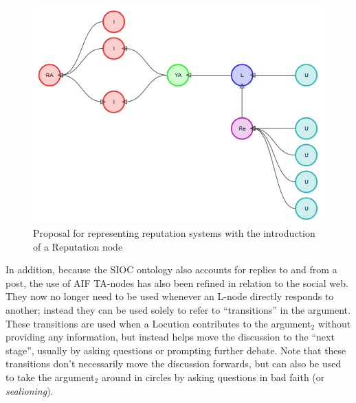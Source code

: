 \begin{figure}
\centering
\includegraphics[scale=\scaleProps]{./figures/cmna_proposals/likes1.png}
\caption{Proposal for representing reputation systems with the introduction of a Reputation node}
\label{figure:cmna:likes2}
\end{figure}

In addition, because the SIOC ontology also accounts for replies to and from a post, the use of AIF TA-nodes has also been refined in relation to the social web. They now no longer need to be used whenever an L-node directly responds to another; instead they can be used solely to refer to ``transitions'' in the argument. These transitions are used when a Locution contributes to the argument$_2$ without providing any information, but instead helps move the discussion to the ``next stage'', usually by asking questions or prompting further debate. Note that these transitions don't necessarily move the discussion forwards, but can also be used to take the argument$_2$ around in circles by asking questions in bad faith (or \textit{sealioning}).






